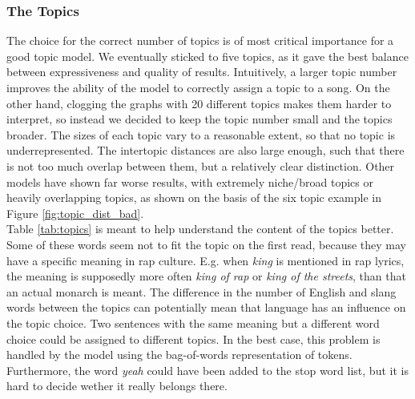 \documentclass[conference]{IEEEtran}
\begin{document}
\subsubsection{The Topics} \label{discussion_topics}
The choice for the correct number of topics is of most critical importance for a good topic model. We eventually sticked to five topics, as it gave the best balance between expressiveness and quality of results. Intuitively, a larger topic number improves the ability of the model to correctly assign a topic to a song. On the other hand, clogging the graphs with 20 different topics makes them harder to interpret, so instead we decided to keep the topic number small and the topics broader. The sizes of each topic vary to a reasonable extent, so that no topic is underrepresented. The intertopic distances are also large enough, such that there is not too much overlap between them, but a relatively clear distinction. Other models have shown far worse results, with extremely niche/broad topics or heavily overlapping topics, as shown on the basis of the six topic example in Figure \ref{fig:topic_dist_bad}.\\
Table \ref{tab:topics} is meant to help understand the content of the topics better. Some of these words seem not to fit the topic on the first read, because they may have a specific meaning in rap culture. E.g. when \textit{king} is mentioned in rap lyrics, the meaning is supposedly more often \textit{king of rap} or \textit{king of the streets}, than that an actual monarch is meant. The difference in the number of English and slang words between the topics can potentially mean that language has an influence on the topic choice. Two sentences with the same meaning but a different word choice could be assigned to different topics. In the best case, this problem is handled by the model using the bag-of-words representation of tokens. Furthermore, the word \textit{yeah} could have been added to the stop word list, but it is hard to decide wether it really belongs there.
\end{document}
